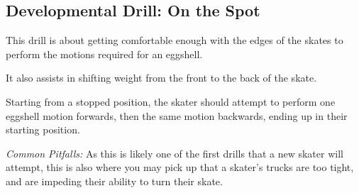\subsection*{Developmental Drill: On the Spot}
\label{drill:sticky/eggshells/spot}

This drill is about getting comfortable enough with the edges of the skates to perform the motions required for an eggshell.   

It also assists in shifting weight from the front to the back of the skate. 

Starting from a stopped position, the skater should attempt to perform one eggshell motion forwards, then the same motion backwards, ending up in their starting position.  


{\it Common Pitfalls:} As this is likely one of the first drills that a new skater will attempt, this is also where you may pick up that a skater's trucks are too tight, and are impeding their ability to turn their skate. 
 

